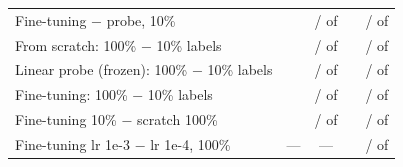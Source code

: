 \begin{tabular}{lcccc}
Fine-tuning $-$ probe, 10\% & \transferTestDiffMeanFinetuneVsProbeFOneZero{} & \transferTestNBetterFinetuneVsProbeFOneZero{} / \transferTestNWorseFinetuneVsProbeFOneZero{} of \transferTestNComparedFinetuneVsProbeFOneZero{} & \transferValDiffMeanFinetuneVsProbeFOneZero{} & \transferValNBetterFinetuneVsProbeFOneZero{} / \transferValNWorseFinetuneVsProbeFOneZero{} of \transferValNComparedFinetuneVsProbeFOneZero{} \\
From scratch: 100\% $-$ 10\% labels & \transferTestDiffMeanScratchFOneZeroZeroVsFOneZero{} & \transferTestNBetterScratchFOneZeroZeroVsFOneZero{} / \transferTestNWorseScratchFOneZeroZeroVsFOneZero{} of \transferTestNComparedScratchFOneZeroZeroVsFOneZero{} & \transferValDiffMeanScratchFOneZeroZeroVsFOneZero{} & \transferValNBetterScratchFOneZeroZeroVsFOneZero{} / \transferValNWorseScratchFOneZeroZeroVsFOneZero{} of \transferValNComparedScratchFOneZeroZeroVsFOneZero{} \\
Linear probe (frozen): 100\% $-$ 10\% labels & \transferTestDiffMeanProbeFOneZeroZeroVsFOneZero{} & \transferTestNBetterProbeFOneZeroZeroVsFOneZero{} / \transferTestNWorseProbeFOneZeroZeroVsFOneZero{} of \transferTestNComparedProbeFOneZeroZeroVsFOneZero{} & \transferValDiffMeanProbeFOneZeroZeroVsFOneZero{} & \transferValNBetterProbeFOneZeroZeroVsFOneZero{} / \transferValNWorseProbeFOneZeroZeroVsFOneZero{} of \transferValNComparedProbeFOneZeroZeroVsFOneZero{} \\
Fine-tuning: 100\% $-$ 10\% labels & \transferTestDiffMeanFinetuneFOneZeroZeroVsFOneZero{} & \transferTestNBetterFinetuneFOneZeroZeroVsFOneZero{} / \transferTestNWorseFinetuneFOneZeroZeroVsFOneZero{} of \transferTestNComparedFinetuneFOneZeroZeroVsFOneZero{} & \transferValDiffMeanFinetuneFOneZeroZeroVsFOneZero{} & \transferValNBetterFinetuneFOneZeroZeroVsFOneZero{} / \transferValNWorseFinetuneFOneZeroZeroVsFOneZero{} of \transferValNComparedFinetuneFOneZeroZeroVsFOneZero{} \\
Fine-tuning 10\% $-$ scratch 100\% & \transferTestDiffMeanFinetuneFOneZeroVsScratchFOneZeroZero{} & \transferTestNBetterFinetuneFOneZeroVsScratchFOneZeroZero{} / \transferTestNWorseFinetuneFOneZeroVsScratchFOneZeroZero{} of \transferTestNComparedFinetuneFOneZeroVsScratchFOneZeroZero{} & \transferValDiffMeanFinetuneFOneZeroVsScratchFOneZeroZero{} & \transferValNBetterFinetuneFOneZeroVsScratchFOneZeroZero{} / \transferValNWorseFinetuneFOneZeroVsScratchFOneZeroZero{} of \transferValNComparedFinetuneFOneZeroVsScratchFOneZeroZero{} \\
Fine-tuning lr 1e-3 $-$ lr 1e-4, 100\% & --- & --- & \transferValDiffMeanLrOneEThreeVsFinetuneFOneZeroZero{} & \transferValNBetterLrOneEThreeVsFinetuneFOneZeroZero{} / \transferValNWorseLrOneEThreeVsFinetuneFOneZeroZero{} of \transferValNComparedLrOneEThreeVsFinetuneFOneZeroZero{} \\

\end{tabular}
